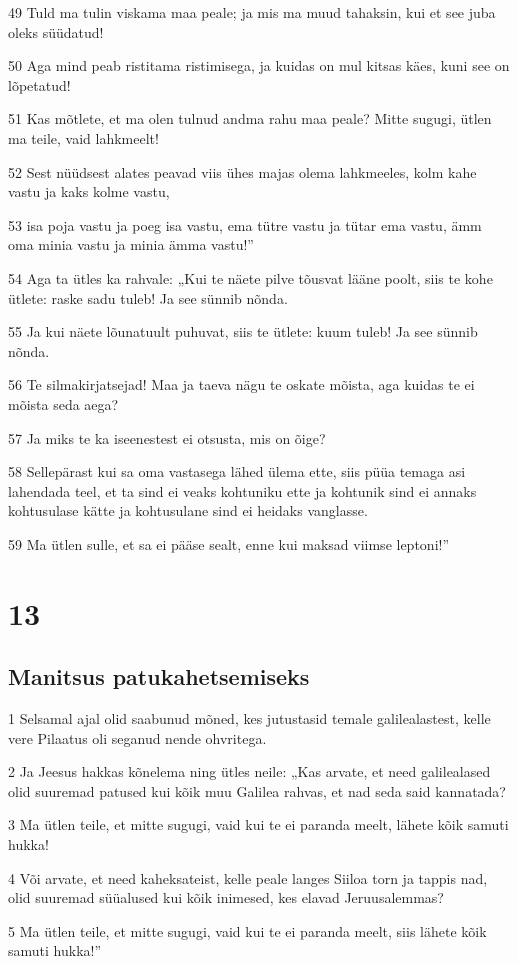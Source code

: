 \par 49 Tuld ma tulin viskama maa peale; ja mis ma muud tahaksin, kui et see juba oleks süüdatud!
\par 50 Aga mind peab ristitama ristimisega, ja kuidas on mul kitsas käes, kuni see on lõpetatud!
\par 51 Kas mõtlete, et ma olen tulnud andma rahu maa peale? Mitte sugugi, ütlen ma teile, vaid lahkmeelt!
\par 52 Sest nüüdsest alates peavad viis ühes majas olema lahkmeeles, kolm kahe vastu ja kaks kolme vastu,
\par 53 isa poja vastu ja poeg isa vastu, ema tütre vastu ja tütar ema vastu, ämm oma minia vastu ja minia ämma vastu!”
\par 54 Aga ta ütles ka rahvale: „Kui te näete pilve tõusvat lääne poolt, siis te kohe ütlete: raske sadu tuleb! Ja see sünnib nõnda.
\par 55 Ja kui näete lõunatuult puhuvat, siis te ütlete: kuum tuleb! Ja see sünnib nõnda.
\par 56 Te silmakirjatsejad! Maa ja taeva nägu te oskate mõista, aga kuidas te ei mõista seda aega?
\par 57 Ja miks te ka iseenestest ei otsusta, mis on õige?
\par 58 Sellepärast kui sa oma vastasega lähed ülema ette, siis püüa temaga asi lahendada teel, et ta sind ei veaks kohtuniku ette ja kohtunik sind ei annaks kohtusulase kätte ja kohtusulane sind ei heidaks vanglasse.
\par 59 Ma ütlen sulle, et sa ei pääse sealt, enne kui maksad viimse leptoni!”


\chapter{13}

\section*{Manitsus patukahetsemiseks}

\par 1 Selsamal ajal olid saabunud mõned, kes jutustasid temale galilealastest, kelle vere Pilaatus oli seganud nende ohvritega.
\par 2 Ja Jeesus hakkas kõnelema ning ütles neile: „Kas arvate, et need galilealased olid suuremad patused kui kõik muu Galilea rahvas, et nad seda said kannatada?
\par 3 Ma ütlen teile, et mitte sugugi, vaid kui te ei paranda meelt, lähete kõik samuti hukka!
\par 4 Või arvate, et need kaheksateist, kelle peale langes Siiloa torn ja tappis nad, olid suuremad süüalused kui kõik inimesed, kes elavad Jeruusalemmas?
\par 5 Ma ütlen teile, et mitte sugugi, vaid kui te ei paranda meelt, siis lähete kõik samuti hukka!”


